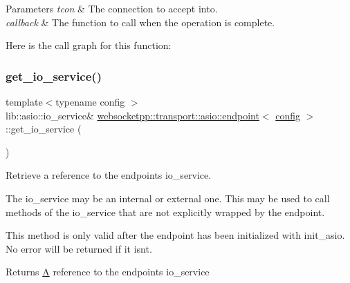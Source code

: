 \begin{DoxyParams}{Parameters}
{\em tcon} & The connection to accept into. \\
\hline
{\em callback} & The function to call when the operation is complete. \\
\hline
\end{DoxyParams}
Here is the call graph for this function\+:
\mbox{\label{classwebsocketpp_1_1transport_1_1asio_1_1endpoint_a97efb3c1915ae8cc38ef92ff9514ebd4}} 
\subsubsection{\texorpdfstring{get\+\_\+io\+\_\+service()}{get\_io\_service()}}
{\footnotesize\ttfamily template$<$typename config $>$ \\
lib\+::asio\+::io\+\_\+service\& \mbox{\hyperlink{classwebsocketpp_1_1transport_1_1asio_1_1endpoint}{websocketpp\+::transport\+::asio\+::endpoint}}$<$ \mbox{\hyperlink{classconfig}{config}} $>$\+::get\+\_\+io\+\_\+service (\begin{DoxyParamCaption}{ }\end{DoxyParamCaption})\hspace{0.3cm}{\ttfamily [inline]}}



Retrieve a reference to the endpoint\textquotesingle{}s io\+\_\+service. 

The io\+\_\+service may be an internal or external one. This may be used to call methods of the io\+\_\+service that are not explicitly wrapped by the endpoint.

This method is only valid after the endpoint has been initialized with {\ttfamily init\+\_\+asio}. No error will be returned if it isn\textquotesingle{}t.

\begin{DoxyReturn}{Returns}
\mbox{\hyperlink{struct_a}{A}} reference to the endpoint\textquotesingle{}s io\+\_\+service 
\end{DoxyReturn}
\mbox{\label{classwebsocketpp_1_1transport_1_1asio_1_1endpoint_a4147ba098fc2f1669d2f880b47917342}} 
